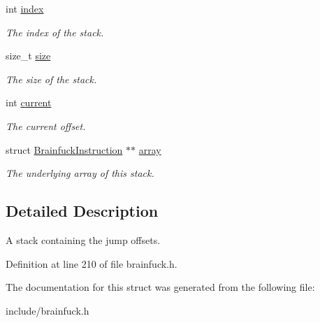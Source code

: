 \begin{DoxyCompactItemize}
\item 
\hypertarget{structBrainfuckParserContext_1_1BrainfuckOffsetStack_a365ed8ebe37105d71d64037f773b0be2}{}int \hyperlink{structBrainfuckParserContext_1_1BrainfuckOffsetStack_a365ed8ebe37105d71d64037f773b0be2}{index}\label{structBrainfuckParserContext_1_1BrainfuckOffsetStack_a365ed8ebe37105d71d64037f773b0be2}

\begin{DoxyCompactList}\small\item\em The index of the stack. \end{DoxyCompactList}\item 
\hypertarget{structBrainfuckParserContext_1_1BrainfuckOffsetStack_a7b8e52f770a34c145c78730df19594ce}{}size\+\_\+t \hyperlink{structBrainfuckParserContext_1_1BrainfuckOffsetStack_a7b8e52f770a34c145c78730df19594ce}{size}\label{structBrainfuckParserContext_1_1BrainfuckOffsetStack_a7b8e52f770a34c145c78730df19594ce}

\begin{DoxyCompactList}\small\item\em The size of the stack. \end{DoxyCompactList}\item 
\hypertarget{structBrainfuckParserContext_1_1BrainfuckOffsetStack_aeb39af07f80ef134b767a562094d813d}{}int \hyperlink{structBrainfuckParserContext_1_1BrainfuckOffsetStack_aeb39af07f80ef134b767a562094d813d}{current}\label{structBrainfuckParserContext_1_1BrainfuckOffsetStack_aeb39af07f80ef134b767a562094d813d}

\begin{DoxyCompactList}\small\item\em The current offset. \end{DoxyCompactList}\item 
\hypertarget{structBrainfuckParserContext_1_1BrainfuckOffsetStack_a92771025f2e90904599bcd8a48cb3000}{}struct \hyperlink{structBrainfuckInstruction}{Brainfuck\+Instruction} $\ast$$\ast$ \hyperlink{structBrainfuckParserContext_1_1BrainfuckOffsetStack_a92771025f2e90904599bcd8a48cb3000}{array}\label{structBrainfuckParserContext_1_1BrainfuckOffsetStack_a92771025f2e90904599bcd8a48cb3000}

\begin{DoxyCompactList}\small\item\em The underlying array of this stack. \end{DoxyCompactList}\end{DoxyCompactItemize}


\subsection{Detailed Description}
A stack containing the jump offsets. 

Definition at line 210 of file brainfuck.\+h.



The documentation for this struct was generated from the following file\+:\begin{DoxyCompactItemize}
\item 
include/brainfuck.\+h\end{DoxyCompactItemize}
